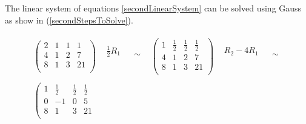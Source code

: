 \documentclass[12pt]{scrartcl}
\begin{document}
\begin{enumerate}
\begin{enumerate}
			The linear system of equations \ref{secondLinearSystem} can be solved using Gauss as show in (\ref{secondStepsToSolve}).
			
			\begin{equation}\label{secondStepsToSolve}
			\begin{split}
				\begin{array}{cccccc}
					\left(
					\begin{array}{ccc|c}
						2	&	1	&	1	&	1 \\
						4	&	1	&	2	&	7 \\
						8	&	1	&	3	&	21 \\
					\end{array}
					\right)
					&
					\begin{array}{c}
					\frac{1}{2}R_1				\\
						 \\
							\\
					\end{array}
					&
					\begin{array}{c}
					 \\
					 \sim\\
					 \\
					\end{array}
					&
					\left(
					\begin{array}{ccc|c}
						1	&	\frac{1}{2}	&	\frac{1}{2}	&	\frac{1}{2} \\
						4	&	1			&	2			&	7 \\
						8	&	1			&	3			&	21 \\
					\end{array}
					\right)
					&
					\begin{array}{c}
					R_2 - 4R_1			\\
								 \\
						\\
					\end{array}
					&
					\begin{array}{c}
					 \\
					 \sim\\
					 \\
					\end{array}
					\\
					\\
					\left(
					\begin{array}{ccc|c}
						1	&	\frac{1}{2}	&	\frac{1}{2}	&	\frac{1}{2} \\
						0	&	-1			&	0			&	5 \\
						8	&	1			&	3			&	21 \\

\end{array}
\end{array}
\end{split}
\end{equation}
\end{enumerate}
\end{enumerate}
\end{document}
